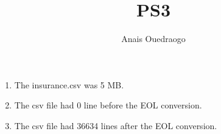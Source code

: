\documentclass{article}
\title{PS3}
\author{Anais Ouedraogo}
\begin{document}
\maketitle




\begin{enumerate}
\item The insurance.csv was 5 MB.
\item The csv file had 0 line before the EOL conversion.
\item The csv file had 36634 lines after the EOL conversion.
\end{enumerate}
\end{document}
